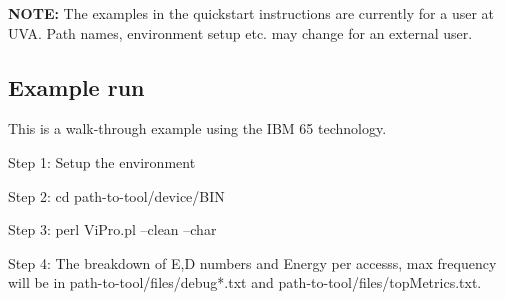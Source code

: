 \textbf{NOTE:}
The examples in the quickstart instructions are currently for a user at UVA. Path names, environment setup etc. may change for an external user.

\subsection{Example run}
This is a walk-through example using the IBM 65 technology.

\begin{description}
\item Step 1: Setup the environment
\item Step 2: cd path-to-tool/device/BIN
\item Step 3: perl ViPro.pl --clean --char
\item Step 4: The breakdown of E,D numbers and Energy per accesss, max frequency will be in path-to-tool/files/debug*.txt and path-to-tool/files/topMetrics.txt.
\end{description}

